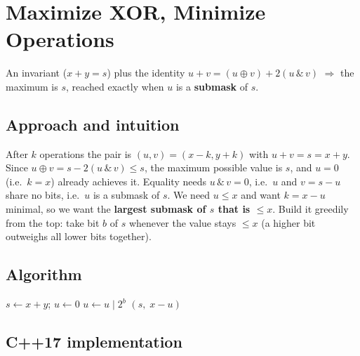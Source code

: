 \section{Maximize XOR, Minimize Operations}
\label{sec:b-maximize-xor}


\begin{patternbox}
An invariant ($x+y=s$) plus the identity $u+v=(u\oplus v)+2(u\,\&\,v)$
$\Rightarrow$ the maximum is $s$, reached exactly when $u$ is a
\textbf{submask} of $s$.
\end{patternbox}

\subsection*{Approach and intuition}

After $k$ operations the pair is $(u,v)=(x-k,y+k)$ with $u+v=s=x+y$. Since
$u\oplus v=s-2(u\,\&\,v)\le s$, the maximum possible value is $s$, and $u=0$
(i.e.\ $k=x$) already achieves it. Equality needs $u\,\&\,v=0$, i.e.\ $u$ and
$v=s-u$ share no bits, i.e.\ $u$ is a submask of $s$. We need $u\le x$ and want
$k=x-u$ minimal, so we want the \textbf{largest submask of $s$ that is $\le x$}.
Build it greedily from the top: take bit $b$ of $s$ whenever the value stays
$\le x$ (a higher bit outweighs all lower bits together).

\subsection*{Algorithm}
\begin{algorithmic}[1]
\State $s\gets x+y$; $u\gets0$
   $u\gets u\mid2^b$ \EndIf
\EndFor
\State \Return $(s,\;x-u)$
\end{algorithmic}


\subsection*{C++17 implementation}

